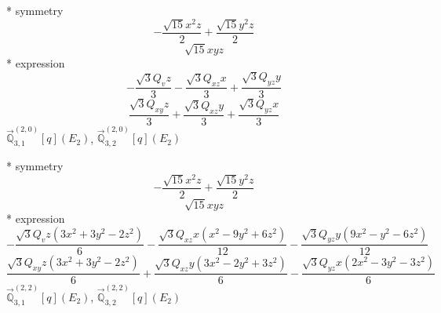 \documentclass[fleqn,8pt]{jsarticle}
\begin{document}
\noindent\quad ** symmetry
\begin{dmath*}
- \frac{\sqrt{15} x^{2} z}{2} + \frac{\sqrt{15} y^{2} z}{2}
\end{dmath*}
\begin{dmath*}
\sqrt{15} x y z
\end{dmath*}
\noindent\quad ** expression
\begin{dmath*}
- \frac{\sqrt{3} Q_{v} z}{3} - \frac{\sqrt{3} Q_{xz} x}{3} + \frac{\sqrt{3} Q_{yz} y}{3}
\end{dmath*}
\begin{dmath*}
\frac{\sqrt{3} Q_{xy} z}{3} + \frac{\sqrt{3} Q_{xz} y}{3} + \frac{\sqrt{3} Q_{yz} x}{3}
\end{dmath*}
\noindent\quad $\vec{\mathbb{Q}}_{3,1}^{(2,0)}[q](E_{2})$, $\vec{\mathbb{Q}}_{3,2}^{(2,0)}[q](E_{2})$

\noindent\quad ** symmetry
\begin{dmath*}
- \frac{\sqrt{15} x^{2} z}{2} + \frac{\sqrt{15} y^{2} z}{2}
\end{dmath*}
\begin{dmath*}
\sqrt{15} x y z
\end{dmath*}
\noindent\quad ** expression
\begin{dmath*}
- \frac{\sqrt{3} Q_{v} z \left(3 x^{2} + 3 y^{2} - 2 z^{2}\right)}{6} - \frac{\sqrt{3} Q_{xz} x \left(x^{2} - 9 y^{2} + 6 z^{2}\right)}{12} - \frac{\sqrt{3} Q_{yz} y \left(9 x^{2} - y^{2} - 6 z^{2}\right)}{12}
\end{dmath*}
\begin{dmath*}
\frac{\sqrt{3} Q_{xy} z \left(3 x^{2} + 3 y^{2} - 2 z^{2}\right)}{6} + \frac{\sqrt{3} Q_{xz} y \left(3 x^{2} - 2 y^{2} + 3 z^{2}\right)}{6} - \frac{\sqrt{3} Q_{yz} x \left(2 x^{2} - 3 y^{2} - 3 z^{2}\right)}{6}
\end{dmath*}
\noindent\quad $\vec{\mathbb{Q}}_{3,1}^{(2,2)}[q](E_{2})$, $\vec{\mathbb{Q}}_{3,2}^{(2,2)}[q](E_{2})$
\end{document}

